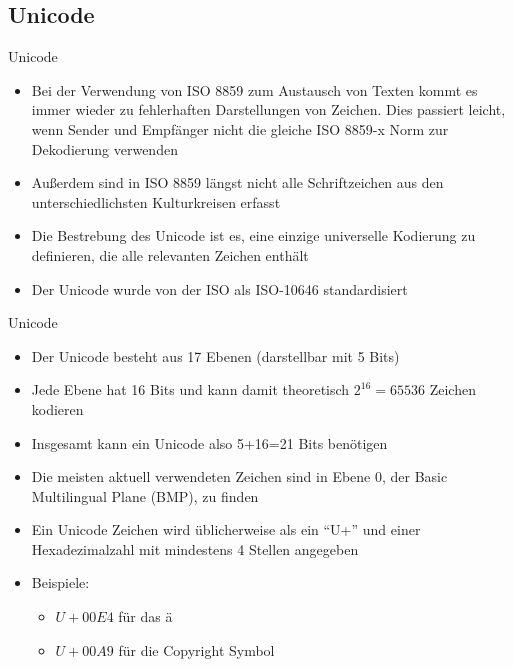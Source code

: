 \documentclass[12pt%
,xcolor=table
,aspectratio=169%
]{beamer}
\begin{document}
\subsection{Unicode}

\begin{frame}{Unicode}
\begin{itemize}
	\item Bei der Verwendung von ISO 8859 zum Austausch von Texten kommt es immer wieder zu fehlerhaften Darstellungen von Zeichen. Dies passiert leicht, wenn Sender und Empfänger nicht die gleiche ISO 8859-x Norm zur Dekodierung verwenden
	\item Außerdem sind in ISO 8859 längst nicht alle Schriftzeichen aus den unterschiedlichsten Kulturkreisen erfasst
	\item Die Bestrebung des Unicode ist es, eine einzige universelle Kodierung zu definieren, die alle relevanten Zeichen enthält
	\item Der Unicode wurde von der ISO als ISO-10646 standardisiert
\end{itemize}

\end{frame}

\begin{frame}{Unicode}
\begin{itemize}
	\item Der Unicode besteht aus 17 Ebenen (darstellbar mit 5 Bits)
	\item Jede Ebene hat 16 Bits und kann damit theoretisch $2^{16}=65536$ Zeichen kodieren
	\item Insgesamt kann ein Unicode also 5+16=21 Bits benötigen
	\item Die meisten aktuell verwendeten Zeichen sind in Ebene $0$, der Basic Multilingual Plane (BMP), zu finden
	\item Ein Unicode Zeichen wird üblicherweise als ein \enquote{U+} und einer Hexadezimalzahl mit mindestens 4 Stellen angegeben
	\item Beispiele:
	\begin{itemize}
		\item $U+00E4$ für das ä
		\item $U+00A9$ für die Copyright Symbol  
	\end{itemize}
\end{itemize}

\end{frame}
\end{document}
